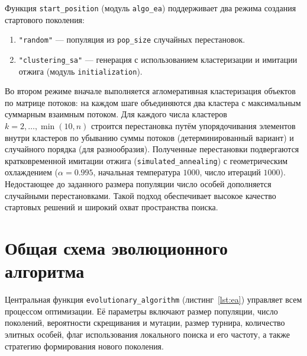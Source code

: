 \documentclass[732]{studrep}
\theoremstyle{nonumberplain}
\begin{document}
Функция \texttt{start\_position} (модуль \texttt{algo\_ea}) поддерживает два режима создания стартового поколения:
\begin{enumerate}
\item \texttt{"random"} — популяция из \texttt{pop\_size} случайных перестановок.
\item \texttt{"clustering\_sa"} — генерация с использованием кластеризации и имитации отжига (модуль \texttt{initialization}).
\end{enumerate}

Во втором режиме вначале выполняется агломеративная кластеризация объектов по матрице потоков: на каждом шаге объединяются два кластера с максимальным суммарным взаимным потоком. Для каждого числа кластеров $k = 2, \dots, \min(10,n)$ строится перестановка путём упорядочивания элементов внутри кластеров по убыванию суммы потоков (детерминированный вариант) и случайного порядка (для разнообразия). Полученные перестановки подвергаются кратковременной имитации отжига (\texttt{simulated\_annealing}) с геометрическим охлаждением ($\alpha = 0.995$, начальная температура $1000$, число итераций $1000$). Недостающее до заданного размера популяции число особей дополняется случайными перестановками. Такой подход обеспечивает высокое качество стартовых решений и широкий охват пространства поиска.

\section{Общая схема эволюционного алгоритма}
\label{sec:ea_scheme}

Центральная функция \texttt{evolutionary\_algorithm} (листинг~\ref{lst:ea}) управляет всем процессом оптимизации. Её параметры включают размер популяции, число поколений, вероятности скрещивания и мутации, размер турнира, количество элитных особей, флаг использования локального поиска и его частоту, а также стратегию формирования нового поколения.
\end{document}
